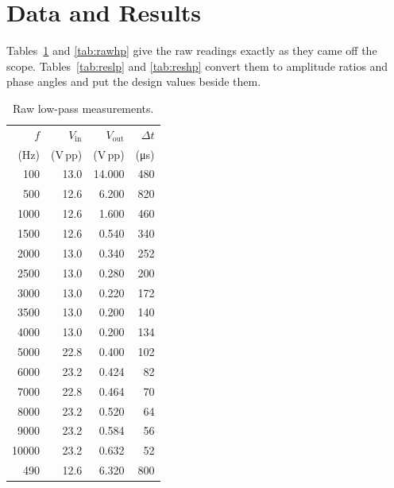 \documentclass[11pt]{article}
\begin{document}
\section*{Data and Results}
Tables~\ref{tab:rawlp} and \ref{tab:rawhp} give the raw readings exactly as they
came off the scope. Tables~\ref{tab:reslp} and \ref{tab:reshp} convert them to
amplitude ratios and phase angles and put the design values beside them.

\begin{minipage}[t]{0.48\linewidth}
\begin{table}[H]
    \centering\small
    \caption{Raw low-pass measurements.}
    \label{tab:rawlp}
    \begin{tabular}{rrrr}
        \toprule
        $f$ & $V_{\text{in}}$ & $V_{\text{out}}$ & $\Delta t$ \\
        (\unit{\hertz}) & (\unit{\volt}\,pp) & (\unit{\volt}\,pp) & (\unit{\micro\second}) \\
        \midrule
          100 & 13.0 & 14.000 & 480 \\
          500 & 12.6 & 6.200 & 820 \\
         1000 & 12.6 & 1.600 & 460 \\
         1500 & 12.6 & 0.540 & 340 \\
         2000 & 13.0 & 0.340 & 252 \\
         2500 & 13.0 & 0.280 & 200 \\
         3000 & 13.0 & 0.220 & 172 \\
         3500 & 13.0 & 0.200 & 140 \\
         4000 & 13.0 & 0.200 & 134 \\
         5000 & 22.8 & 0.400 & 102 \\
         6000 & 23.2 & 0.424 & 82 \\
         7000 & 22.8 & 0.464 & 70 \\
         8000 & 23.2 & 0.520 & 64 \\
         9000 & 23.2 & 0.584 & 56 \\
        10000 & 23.2 & 0.632 & 52 \\
        \midrule
        490 & 12.6 & 6.320 & 800 \\
        \bottomrule
    \end{tabular}
\end{table}
\end{minipage}\hfill
\end{document}
